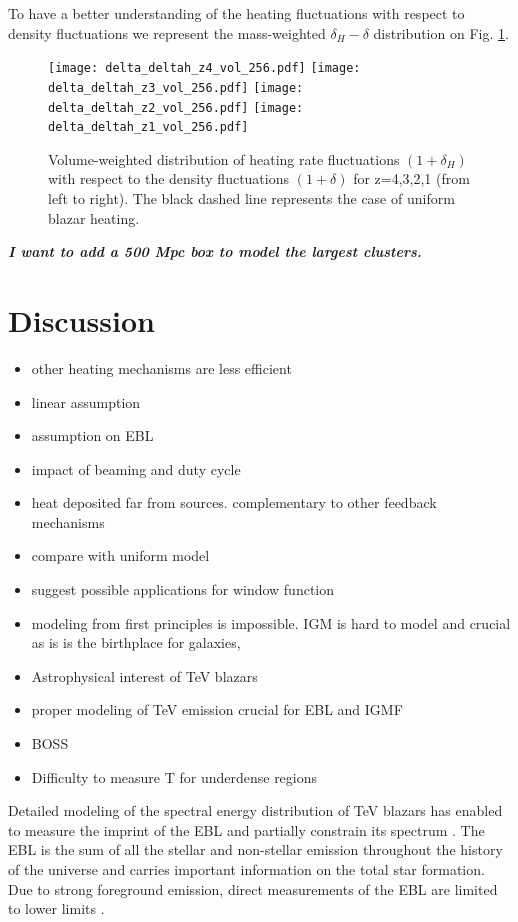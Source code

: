 \documentclass[twocolumns]{emulateapj}
\newcommand\ALc[1]{{\color{red} \bf #1}} %
\begin{document}
{To have a better understanding of the heating fluctuations with respect to density fluctuations we represent the mass-weighted  $\delta_H-\delta$ distribution on Fig. \ref{fig:deltas}.


\begin{figure}[h]
  \centering
  \texttt{[image: delta\_deltah\_z4\_vol\_256.pdf]}
  \texttt{[image: delta\_deltah\_z3\_vol\_256.pdf]}
  \texttt{[image: delta\_deltah\_z2\_vol\_256.pdf]}
  \texttt{[image: delta\_deltah\_z1\_vol\_256.pdf]}
\caption{Volume-weighted distribution of heating rate fluctuations $(1+\delta_H)$ with respect to the density fluctuations $(1+\delta)$ for z=4,3,2,1 (from left to right). The black dashed line represents the case of uniform blazar heating.}
  \label{fig:deltas}
\end{figure}

}
\ALc{\textit{I want to add a 500 Mpc box to model the largest clusters.}}

\section{Discussion}
\begin{itemize}
\item other heating mechanisms are less efficient
\item linear assumption
\item assumption on EBL
\item impact of beaming and duty cycle
\item heat deposited far from sources. complementary to other feedback mechanisms
\item compare with uniform model
\item suggest possible applications for window function

\item modeling from first principles is impossible. IGM is hard to model and crucial as is is the birthplace for galaxies,
\item Astrophysical interest of TeV blazars
\item proper modeling of TeV emission crucial for EBL and IGMF
\item BOSS
\item Difficulty to measure T for underdense regions
\end{itemize}
Detailed modeling of the spectral energy distribution of TeV blazars has enabled to measure the imprint of the EBL and partially  constrain its spectrum \citep{2013A&A...550A...4H}. The EBL is the sum of all the stellar and non-stellar emission throughout the history of the universe and carries important information on the total star formation. Due to strong foreground emission, direct measurements of the EBL are limited to lower limits \citep{2006A&A...451..417D}. 
\end{document}
